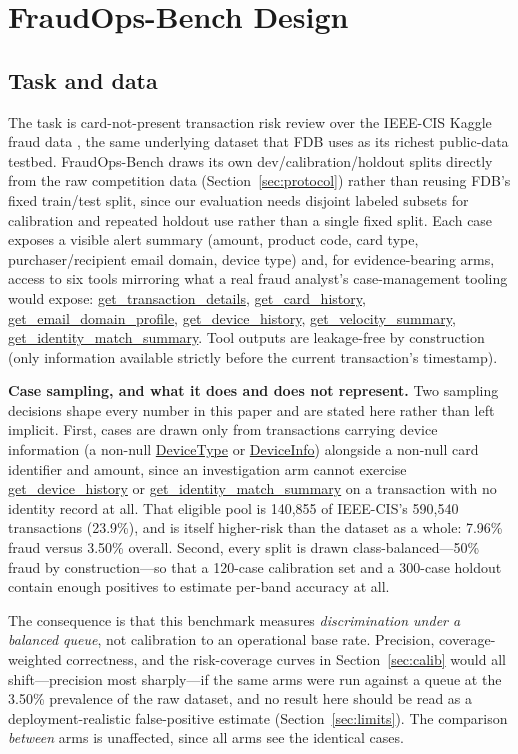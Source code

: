 \documentclass[]{ieeeaccess}
\newcommand{\code}[1]{\url{#1}}
\begin{document}
\section{FraudOps-Bench Design}\label{sec:design}

\subsection{Task and data}\label{sec:task}

The task is card-not-present transaction risk review over the IEEE-CIS
Kaggle fraud data \cite{ieeecis2019}, the same underlying dataset that
FDB \cite{fdb2022} uses as its richest public-data testbed.
FraudOps-Bench draws its own
dev/calibration/holdout splits directly from the raw competition data
(Section~\ref{sec:protocol}) rather than reusing FDB's fixed train/test split, since our
evaluation needs disjoint labeled subsets for calibration and repeated
holdout use rather than a single fixed split. Each case exposes a
visible alert summary (amount, product code, card type,
purchaser/recipient email domain, device type) and, for evidence-bearing
arms, access to six tools mirroring what a real fraud analyst's
case-management tooling would expose: \code{get_transaction_details},
\code{get_card_history}, \code{get_email_domain_profile},
\code{get_device_history}, \code{get_velocity_summary},
\code{get_identity_match_summary}. Tool outputs are leakage-free by
construction (only information available strictly before the current
transaction's timestamp).

\textbf{Case sampling, and what it does and does not represent.} Two
sampling decisions shape every number in this paper and are stated here
rather than left implicit. First, cases are drawn only from
transactions carrying device information (a non-null \code{DeviceType}
or \code{DeviceInfo}) alongside a non-null card identifier and amount,
since an investigation arm cannot exercise
\code{get_device_history} or \code{get_identity_match_summary} on a
transaction with no identity record at all. That eligible pool is
140{,}855 of IEEE-CIS's 590{,}540 transactions (23.9\%), and is itself
higher-risk than the dataset as a whole: 7.96\% fraud versus 3.50\%
overall. Second, every split is drawn class-balanced---50\% fraud by
construction---so that a 120-case calibration set and a 300-case
holdout contain enough positives to estimate per-band accuracy at all.

The consequence is that this benchmark measures \textit{discrimination
under a balanced queue}, not calibration to an operational base rate.
Precision, coverage-weighted correctness, and the risk-coverage curves
in Section~\ref{sec:calib} would all shift---precision most
sharply---if the same arms were run against a queue at the 3.50\%
prevalence of the raw dataset, and no result here should be read as a
deployment-realistic false-positive estimate
(Section~\ref{sec:limits}). The comparison \textit{between} arms is
unaffected, since all arms see the identical cases.
\end{document}
